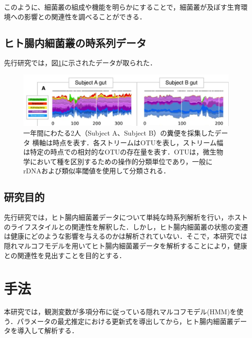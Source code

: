 \documentclass[dvipdfmx,autodetect-engine]{jsreport}
\begin{document}
このように、細菌叢の組成や機能を明らかにすることで，細菌叢が及ぼす生育環境への影響との関連性を調べることができる．


\section{ヒト腸内細菌叢の時系列データ}

先行研究\cite{pmid25146375}では，図\ref{fig:1.1}に示されたデータが取られた．

\begin{figure}[htp]
 \begin{center}
  \includegraphics[scale=0.6]{Picture1.png}
 \end{center}
 \caption{一年間にわたる2人（Subject A、Subject B）の糞便を採集したデータ\cite{pmid25146375}\newline
横軸は時点を表す．各ストリームはOTUを表し，ストリーム幅は特定の時点での相対的なOTUの存在量を表す．OTUは，微生物学において種を区別するための操作的分類単位であり，一般にrDNAおよび類似率閾値を使用して分類される．}\label{fig:1.1}
\end{figure}

\section{研究目的}

先行研究では，ヒト腸内細菌叢データについて単純な時系列解析を行い，ホストのライフスタイルとの関連性を解釈した．しかし，ヒト腸内細菌叢の状態の変遷は健康にどのような影響を与えるのかは解析されていない．そこで，本研究では隠れマルコフモデルを用いてヒト腸内細菌叢データを解析することにより，健康との関連性を見出すことを目的とする．




\chapter{手法}

本研究では，観測変数が多項分布に従っている隠れマルコフモデル(HMM)を使う．パラメータの最尤推定における更新式を導出してから，ヒト腸内細菌叢データを導入して解析する．
\end{document}
